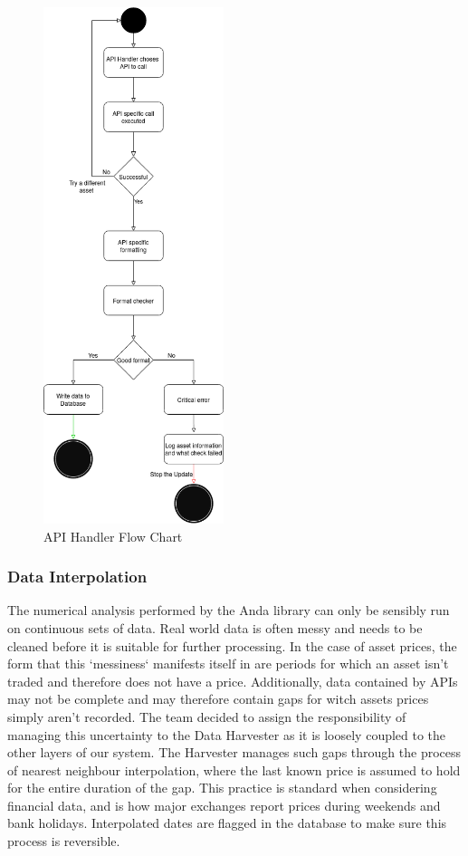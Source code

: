 \documentclass[main.tex]{subfiles}
\begin{document}
\begin{figure}[H]
    \centering
    \includegraphics[width=0.47\textwidth]{04Design/04Pictures/api_handler_v3.png}
    \caption{API Handler Flow Chart \cite{TR}}
\end{figure}

\subsubsection{Data Interpolation}
The numerical analysis performed by the Anda library can only be sensibly run on continuous sets of data. Real world data is often messy and needs to be cleaned before it is suitable for further processing. In the case of asset prices, the form that this `messiness` manifests itself in are periods for which an asset isn't traded and therefore does not have a price. Additionally, data contained by APIs may not be complete and may therefore contain gaps for witch assets prices simply aren't recorded. The team decided to assign the responsibility of managing this uncertainty to the Data Harvester as it is loosely coupled to the other layers of our system. The Harvester manages such gaps through the process of nearest neighbour interpolation, where the last known price is assumed to hold for the entire duration of the gap. This practice is standard when considering financial data, and is how major exchanges report prices during weekends and bank holidays. Interpolated dates are flagged in the database to make sure this process is reversible. 
\end{document}
